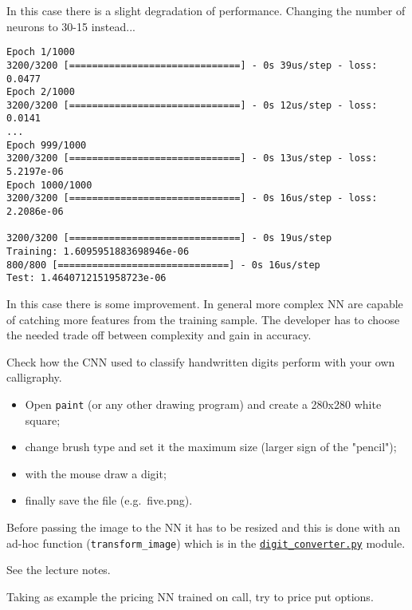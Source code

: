\begin{Answer}
In this case there is a slight degradation of performance.
Changing the number of neurons to 30-15 instead...

\begin{codebox}[size=fbox, boxrule=1pt, colback=cellbackground, colframe=cellborder]
\begin{Verbatim}[commandchars=\\\{\}]
Epoch 1/1000
3200/3200 [==============================] - 0s 39us/step - loss: 0.0477
Epoch 2/1000
3200/3200 [==============================] - 0s 12us/step - loss: 0.0141
...
Epoch 999/1000
3200/3200 [==============================] - 0s 13us/step - loss: 5.2197e-06
Epoch 1000/1000
3200/3200 [==============================] - 0s 16us/step - loss: 2.2086e-06

3200/3200 [==============================] - 0s 19us/step
Training: 1.6095951883698946e-06
800/800 [==============================] - 0s 16us/step
Test: 1.4640712151958723e-06
\end{Verbatim}
\end{codebox}

In this case there is some improvement. In general more complex NN are
capable of catching more features from the training sample. The
developer has to choose the needed trade off between complexity and gain
in accuracy.
\end{Answer}

\begin{Exercise}
Check how the CNN used to classify handwritten digits perform with your own calligraphy.

\begin{itemize}
\tightlist
\item
  Open \texttt{paint} (or any other drawing program) and create a 280x280 white square;
\item
  change brush type and set it the maximum size (larger sign of the "pencil");
\item
  with the mouse draw a digit;
\item
  finally save the file (e.g.~five.png).
\end{itemize}

Before passing the image to the NN it has to be resized and this is done
with an ad-hoc function (\texttt{transform\_image}) which is in the
\href{https://drive.google.com/file/d/1FMYvOJDDOdIv7kDb2VIGhAkNNmReiOb_/view?usp=sharing}{\texttt{digit\_converter.py}} module.
\end{Exercise}
\begin{Answer}
See the lecture notes.
\end{Answer}

\begin{Exercise}
Taking as example the pricing NN trained on call, try to price put
options.
\end{Exercise}
\begin{Answer}
\end{Answer}
